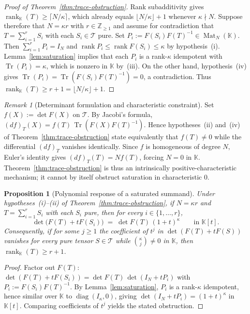 \documentclass[11pt,reqno]{amsart}
\newtheorem{proposition}[theorem]{Proposition}
\theoremstyle{definition}
\theoremstyle{remark}
\newtheorem{remark}[theorem]{Remark}
\numberwithin{equation}{section}
\newcommand{\KK}{\mathbb{K}}
\newcommand{\ZZ}{\mathbb{Z}}
\newcommand{\cT}{\mathcal{T}}
\DeclareMathOperator{\rk}{rank}
\DeclareMathOperator{\Mat}{Mat}
\DeclareMathOperator{\Tr}{Tr}
\DeclareMathOperator{\diag}{diag}
\begin{document}
\begin{proof}[Proof of Theorem~\ref{thm:trace-obstruction}]
Rank subadditivity gives $\rk_{\KK}(T) \ge \lceil N/\kappa \rceil$, which already equals $\lfloor N/\kappa \rfloor + 1$ whenever $\kappa \nmid N$. Suppose therefore that $N = \kappa r$ with $r \in \ZZ_{\ge 1}$ and assume for contradiction that $T = \sum_{i=1}^r S_i$ with each $S_i \in \cT$ pure. Set $P_i := F(S_i) F(T)^{-1} \in \Mat_N(\KK)$. Then $\sum_{i=1}^r P_i = I_N$ and $\rk P_i \le \rk F(S_i) \le \kappa$ by hypothesis~\textup{(i)}. Lemma~\ref{lem:saturation} implies that each $P_i$ is a rank-$\kappa$ idempotent with $\Tr(P_i) = \kappa$, which is nonzero in $\KK$ by~\textup{(iii)}. On the other hand, hypothesis~\textup{(iv)} gives $\Tr(P_i) = \Tr(F(S_i) F(T)^{-1}) = 0$, a contradiction. Thus $\rk_{\KK}(T) \ge r + 1 = \lfloor N/\kappa \rfloor + 1$.
\end{proof}

\begin{remark}[Determinant formulation and characteristic constraint]\label{rem:det-differential}
Set $f(X) := \det F(X)$ on $\cT$. By Jacobi's formula, $(df)_T(X) = f(T)\,\Tr(F(X) F(T)^{-1})$. Hence hypotheses~\textup{(ii)} and~\textup{(iv)} of Theorem~\ref{thm:trace-obstruction} state equivalently that $f(T) \neq 0$ while the differential $(df)_T$ vanishes identically. Since $f$ is homogeneous of degree $N$, Euler's identity gives $(df)_T(T) = N f(T)$, forcing $N = 0$ in $\KK$. Theorem~\ref{thm:trace-obstruction} is thus an intrinsically positive-characteristic mechanism; it cannot by itself obstruct saturation in characteristic $0$.
\end{remark}

\begin{proposition}[Polynomial response of a saturated summand]\label{prop:poly-response}
Under hypotheses~\textup{(i)}--\textup{(ii)} of Theorem~\ref{thm:trace-obstruction}, if $N = \kappa r$ and $T = \sum_{i=1}^r S_i$ with each $S_i$ pure, then for every $i \in \{1, \dots, r\}$,
\begin{equation}\label{eq:poly-response}
  \det\bigl(F(T) + t F(S_i)\bigr) \;=\; \det F(T)\,(1 + t)^\kappa \qquad \text{in } \KK[t].
\end{equation}
Consequently, if for some $j \ge 1$ the coefficient of $t^j$ in $\det(F(T) + t F(S))$ vanishes for every pure tensor $S \in \cT$ while $\binom{\kappa}{j} \neq 0$ in $\KK$, then $\rk_{\KK}(T) \ge r + 1$.
\end{proposition}

\begin{proof}
Factor out $F(T)$: $\det(F(T) + t F(S_i)) = \det F(T)\,\det(I_N + t P_i)$ with $P_i := F(S_i) F(T)^{-1}$. By Lemma~\ref{lem:saturation}, $P_i$ is a rank-$\kappa$ idempotent, hence similar over $\KK$ to $\diag(I_\kappa, 0)$, giving $\det(I_N + t P_i) = (1 + t)^\kappa$ in $\KK[t]$. Comparing coefficients of $t^j$ yields the stated obstruction.
\end{proof}
\end{document}
